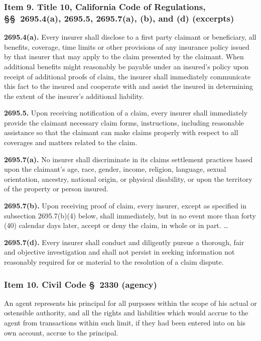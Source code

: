 \subsubsection*{Item 9. Title 10, California Code of Regulations, \S\S~2695.4(a), 2695.5, 2695.7(a), (b), and (d) (excerpts)}

\begin{quoting}
\noindent \textbf{2695.4(a).} Every insurer shall disclose to a first party claimant or beneficiary, all benefits, coverage, time limits or other provisions of any insurance policy issued by that insurer that may apply to the claim presented by the claimant. When additional benefits might reasonably be payable under an insured's policy upon receipt of additional proofs of claim, the insurer shall immediately communicate this fact to the insured and cooperate with and assist the insured in determining the extent of the insurer's additional liability.

\noindent \textbf{2695.5.} Upon receiving notification of a claim, every insurer shall immediately provide the claimant necessary claim forms, instructions, including reasonable assistance so that the claimant can make claims properly with respect to all coverages and matters related to the claim.

\noindent \textbf{2695.7(a).} No insurer shall discriminate in its claims settlement practices based upon the claimant's age, race, gender, income, religion, language, sexual orientation, ancestry, national origin, or physical disability, or upon the territory of the property or person insured.

\noindent \textbf{2695.7(b).} Upon receiving proof of claim, every insurer, except as specified in subsection 2695.7(b)(4) below, shall immediately, but in no event more than forty (40) calendar days later, accept or deny the claim, in whole or in part. \dots

\noindent \textbf{2695.7(d).} Every insurer shall conduct and diligently pursue a thorough, fair and objective investigation and shall not persist in seeking information not reasonably required for or material to the resolution of a claim dispute.
\end{quoting}

\subsubsection*{Item 10. Civil Code \S~2330 (agency)}

\begin{quoting}
\noindent An agent represents his principal for all purposes within the scope of his actual or ostensible authority, and all the rights and liabilities which would accrue to the agent from transactions within such limit, if they had been entered into on his own account, accrue to the principal.
\end{quoting}
